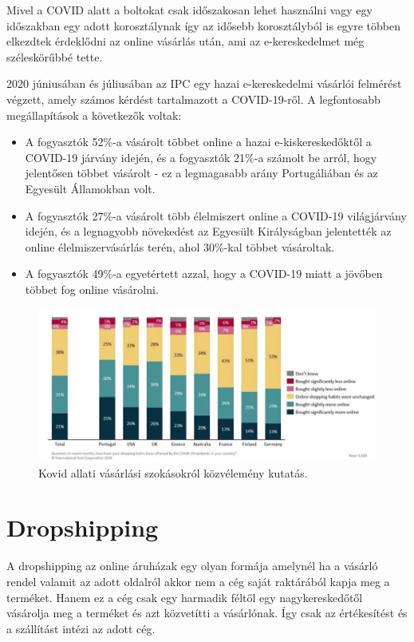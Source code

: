 Mivel a COVID alatt a boltokat csak időszakosan lehet használni vagy egy időszakban egy adott korosztálynak így az idősebb korosztályból is egyre többen elkezdtek érdeklődni az online vásárlás után, ami az e-kereskedelmet még széleskörűbbé tette.

\cite{20} 2020 júniusában és júliusában az IPC egy hazai e-kereskedelmi vásárlói felmérést végzett, amely számos kérdést tartalmazott a COVID-19-ről. A legfontosabb megállapítások a következők voltak:
\begin{itemize}
    \item A fogyasztók 52\%-a vásárolt többet online a hazai e-kiskereskedőktől a COVID-19 járvány idején, és a fogyasztók 21\%-a számolt be arról, hogy jelentősen többet vásárolt - ez a legmagasabb arány Portugáliában és az Egyesült Államokban volt.
    \item A fogyasztók 27\%-a vásárolt több élelmiszert online a COVID-19 világjárvány idején, és a legnagyobb növekedést az Egyesült Királyságban jelentették az online élelmiszervásárlás terén, ahol 30\%-kal többet vásároltak.
    \item A fogyasztók 49\%-a egyetértett azzal, hogy a COVID-19 miatt a jövőben többet fog online vásárolni.
\end{itemize}

\begin{figure}[h]
\centering
\includegraphics[scale=0.5]{images/IPC_velemeny_kutatas.jpg}
\caption{Kovid allati vásárlási szokásokról közvélemény kutatás.}
\label{fig:velemeny_kutatas}
\end{figure}

\section{Dropshipping}

\cite{21} A dropshipping az online áruházak egy olyan formája amelynél ha a vásárló rendel valamit az adott oldalról akkor nem a cég saját raktárából kapja meg a terméket. Hanem ez a cég csak egy harmadik féltől egy nagykereskedőtől vásárolja meg a terméket és azt közvetítti a vásárlónak. Így csak az értékesítést és a szállítást intézi az adott cég. 

